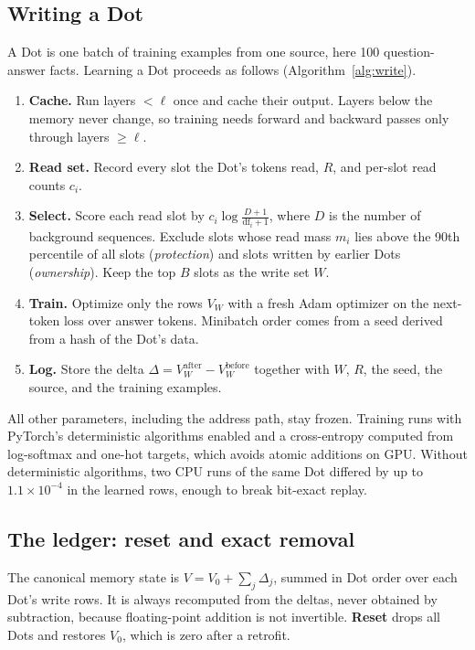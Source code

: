 \documentclass[11pt]{article}
\begin{document}
\subsection{Writing a Dot}
\label{sec:write}

A Dot is one batch of training examples from one source, here 100 question-answer facts. Learning a Dot proceeds as follows (Algorithm~\ref{alg:write}).

\begin{enumerate}
  \item \textbf{Cache.} Run layers $<\ell$ once and cache their output. Layers below the memory never change, so training needs forward and backward passes only through layers $\geq\ell$.
  \item \textbf{Read set.} Record every slot the Dot's tokens read, $R$, and per-slot read counts $c_i$.
  \item \textbf{Select.} Score each read slot by $c_i \log\frac{D+1}{\mathrm{df}_i+1}$, where $D$ is the number of background sequences. Exclude slots whose read mass $m_i$ lies above the 90th percentile of all slots (\emph{protection}) and slots written by earlier Dots (\emph{ownership}). Keep the top $B$ slots as the write set $W$.
  \item \textbf{Train.} Optimize only the rows $V_W$ with a fresh Adam optimizer \citep{kingma2015adam} on the next-token loss over answer tokens. Minibatch order comes from a seed derived from a hash of the Dot's data.
  \item \textbf{Log.} Store the delta $\Delta = V_W^{\text{after}} - V_W^{\text{before}}$ together with $W$, $R$, the seed, the source, and the training examples.
\end{enumerate}

All other parameters, including the address path, stay frozen. Training runs with PyTorch's deterministic algorithms enabled \citep{pytorchrepro} and a cross-entropy computed from log-softmax and one-hot targets, which avoids atomic additions on GPU. Without deterministic algorithms, two CPU runs of the same Dot differed by up to $1.1\times10^{-4}$ in the learned rows, enough to break bit-exact replay.


\subsection{The ledger: reset and exact removal}
\label{sec:ledger}

The canonical memory state is $V = V_0 + \sum_{j} \Delta_j$, summed in Dot order over each Dot's write rows. It is always recomputed from the deltas, never obtained by subtraction, because floating-point addition is not invertible. \textbf{Reset} drops all Dots and restores $V_0$, which is zero after a retrofit.
\end{document}
